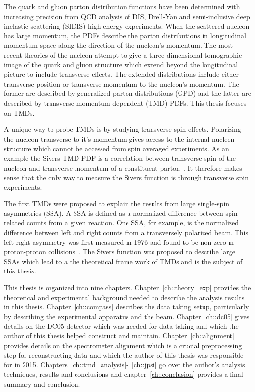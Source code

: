 The quark and gluon parton distribution functions have been determined with
increasing precision from QCD analysis of DIS, Drell-Yan and semi-inclusive deep
inelastic scattering (SIDIS) high energy experiments.  When the scattered
nucleon has large momentum, the PDFs describe the parton distributions
in longitudinal momentum space along the direction of the nucleon's momentum.
The most recent theories of the nucleon attempt to give a three dimensional
tomographic image of the quark and gluon structure which extend beyond the
longitudinal picture to include transverse effects.  The extended distributions
include either transverse position or transverse momentum to the nucleon's
momentum.  The former are described by generalized parton distributions (GPD)
and the latter are described by transverse momentum dependent (TMD) PDFs.  This
thesis focuses on TMDs.

A unique way to probe TMDs is by studying transverse spin effects.  Polarizing
the nucleon transverse to it's momentum gives access to the internal nucleon
structure which cannot be accessed from spin averaged experiments.  As an
example the Sivers TMD PDF is a correlation between transverse spin of the
nucleon and transverse momentum of a constituent parton~\cite{Sivers}.  It
therefore makes sense that the only way to measure the Sivers function is
through transverse spin experiments.

The first TMDs were proposed to explain the results from large single-spin
asymmetries (SSA).  A SSA is defined as a normalized difference between spin
related counts from a given reaction.  One SSA, for example, is the normalized
difference between left and right counts from a transversely polarized beam.
This left-right asymmetry was first measured in 1976 and found to be non-zero in
proton-proton collisions~\cite{PhysRevLett.36.929}.  The Sivers function was
proposed to describe large SSAs which lead to a the theoretical frame work of
TMDs and is the subject of this thesis.

This thesis is organized into nine chapters.  Chapter~\ref{ch::theory_exp}
provides the theoretical and experimental background needed to describe the
analysis results in this thesis.  Chapter~\ref{ch::compass} describes the data
taking setup, particularly by describing the experimental apparatus and the
beam.  Chapter~\ref{ch::dc05} gives details on the DC05 detector which was
needed for data taking and which the author of this thesis helped construct and
maintain.  Chapter~\ref{ch::alignment} provides details on the spectrometer
alignment which is a crucial preprocessing step for reconstructing data and
which the author of this thesis was responsible for in 2015.
Chapters~\ref{ch::tmd_analysis}-~\ref{ch::jpsi} go over the author's analysis
techniques, results and conclusions and chapter~\ref{ch::conclusion} provides
a final summary and conclusion.
